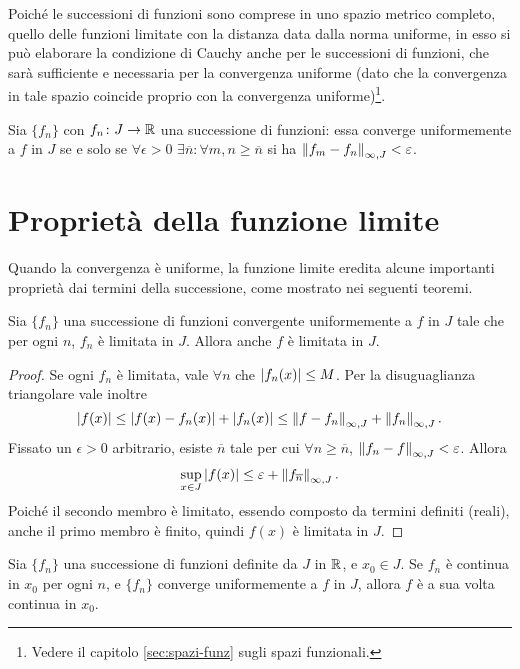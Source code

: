 Poiché le successioni di funzioni sono comprese in uno spazio metrico completo, quello delle funzioni limitate con la distanza data dalla norma uniforme, in esso si può elaborare la condizione di Cauchy anche per le successioni di funzioni, che sarà sufficiente e necessaria per la convergenza uniforme (dato che la convergenza in tale spazio coincide proprio con la convergenza uniforme)\footnote{Vedere il capitolo \ref{sec:spazi-funz} sugli spazi funzionali.}.
\begin{teorema}
Sia $\{f_n\}$ con $f_n\colon J\to\mathbb{R}$ una successione di funzioni: essa converge uniformemente a $f$ in $J$ se e solo se $\forall\epsilon>0$ $\exists\overline{n}\colon\forall m,n\geq\overline{n}$ si ha $\left\|{f_m-f_n}\right\|_{\infty,J}<\varepsilon$.
\end{teorema}

\section{Proprietà della funzione limite}
Quando la convergenza è uniforme, la funzione limite eredita alcune importanti proprietà dai termini della successione, come mostrato nei seguenti teoremi.
\begin{teorema} \label{t:unif_limitata}
Sia $\{f_n\}$ una successione di funzioni convergente uniformemente a $f$ in $J$ tale che per ogni $n$, $f_n$ è limitata in $J$. Allora anche $f$ è limitata in $J$.
\end{teorema}
\begin{proof}
Se ogni $f_n$ è limitata, vale $\forall n$ che $\left|{f_n(x)}\right|\leq M$.
Per la disuguaglianza triangolare vale inoltre
\[
\left|{f(x)}\right|\leq\left|{f(x)-f_n(x)}\right|+\left|{f_n(x)}\right|\leq\left\|{f-f_n}\right\|_{\infty,J}+\left\|{f_n}\right\|_{\infty,J}.
\]
Fissato un $\epsilon>0$ arbitrario, esiste $\overline{n}$ tale per cui $\forall n\geq\overline{n}$, $\left\|{f_n-f}\right\|_{\infty,J}<\varepsilon$. Allora
\[
\sup_{x\in J}\left|{f(x)}\right|\leq\varepsilon+\left\|{f_{\overline n}}\right\|_{\infty,J}.
\]
Poiché il secondo membro è limitato, essendo composto da termini definiti (reali), anche il primo membro è finito, quindi $f(x)$ è limitata in $J$.
\end{proof}
\begin{teorema} \label{t:continuita_conv_uniforme}
Sia $\{f_n\}$ una successione di funzioni definite da $J$ in $\mathbb{R}$, e $x_0\in J$. Se $f_n$ è continua in $x_0$ per ogni $n$, e $\{f_n\}$ converge uniformemente a $f$ in $J$, allora $f$ è a sua volta continua in $x_0$.
\end{teorema}
